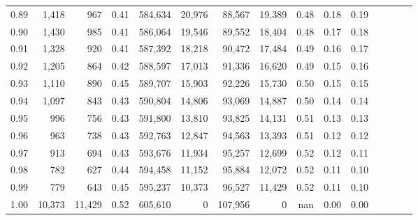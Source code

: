 \begin{tabular}{rrrcrrrrrrrrrrr}
0.89 &   1,418 &     967 &                                       0.41 &  584,634 &   20,976 &   88,567 &   19,389 &  0.48 &  0.18 &                         0.19 \\
0.90 &   1,430 &     985 &                                       0.41 &  586,064 &   19,546 &   89,552 &   18,404 &  0.48 &  0.17 &                         0.18 \\
0.91 &   1,328 &     920 &                                       0.41 &  587,392 &   18,218 &   90,472 &   17,484 &  0.49 &  0.16 &                         0.17 \\
0.92 &   1,205 &     864 &                                       0.42 &  588,597 &   17,013 &   91,336 &   16,620 &  0.49 &  0.15 &                         0.16 \\
0.93 &   1,110 &     890 &                                       0.45 &  589,707 &   15,903 &   92,226 &   15,730 &  0.50 &  0.15 &                         0.15 \\
0.94 &   1,097 &     843 &                                       0.43 &  590,804 &   14,806 &   93,069 &   14,887 &  0.50 &  0.14 &                         0.14 \\
0.95 &     996 &     756 &                                       0.43 &  591,800 &   13,810 &   93,825 &   14,131 &  0.51 &  0.13 &                         0.13 \\
0.96 &     963 &     738 &                                       0.43 &  592,763 &   12,847 &   94,563 &   13,393 &  0.51 &  0.12 &                         0.12 \\
0.97 &     913 &     694 &                                       0.43 &  593,676 &   11,934 &   95,257 &   12,699 &  0.52 &  0.12 &                         0.11 \\
0.98 &     782 &     627 &                                       0.44 &  594,458 &   11,152 &   95,884 &   12,072 &  0.52 &  0.11 &                         0.10 \\
0.99 &     779 &     643 &                                       0.45 &  595,237 &   10,373 &   96,527 &   11,429 &  0.52 &  0.11 &                         0.10 \\
1.00 &  10,373 &  11,429 &                                       0.52 &  605,610 &        0 &  107,956 &        0 &   nan &  0.00 &                         0.00 \\
\bottomrule
\end{tabular}
